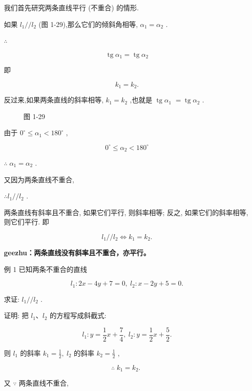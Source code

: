 \documentclass[lang=cn,newtx,10.5pt,scheme=chinese]{elegantbook}
\begin{document}
我们首先研究两条直线平行 (不重合) 的情形.

如果 \({l}_{1}//{l}_{2}\) (图 1-29),那么它们的倾斜角相等, \({\alpha }_{1} = {\alpha }_{2}\) .

\(\therefore\)

\[
  \operatorname{tg}{\alpha }_{1} = \operatorname{tg}{\alpha }_{2}
\]

即

\[
    {k}_{1} = {k}_{2}\text{.}
\]

反过来,如果两条直线的斜率相等, \({k}_{1} = {k}_{2}\) ,也就是 \(\operatorname{tg}{\alpha }_{1}\) \(= \operatorname{tg}{\alpha }_{2}\) .

\begin{figure}[h]
  \centering
  
  \caption{图 1-29}
\end{figure}

由于 \({0}^{ \circ } \leq {\alpha }_{1} < {180}^{ \circ }\) ,

\[
    {0}^{ \circ } \leq {\alpha }_{2} < {180}^{ \circ }
\]

\(\therefore \;{\alpha }_{1} = {\alpha }_{2}\) .

又因为两条直线不重合,

\(\therefore {l}_{1}//{l}_{2}\) .
\begin{corollary}
两条直线有斜率且不重合, 如果它们平行, 则斜率相等; 反之, 如果它们的斜率相等, 则它们平行. 即

\[
    {l}_{1}//{l}_{2} \Leftrightarrow {k}_{1} = {k}_{2}\text{.}
\]

\end{corollary}

\textbf{geezhu：两条直线没有斜率且不重合，亦平行。}

例 1 已知两条不重合的直线

\[
    {l}_{1} : {2x} - {4y} + 7 = 0,\;{l}_{2} : x - {2y} + 5 = 0.
\]

求证: \({l}_{1}//{l}_{2}\) .

证明: 把 \({l}_{1}\text{、}{l}_{2}\) 的方程写成斜截式:

\[
    {l}_{1} : y = \frac{1}{2}x + \frac{7}{4},\;{l}_{2} : y = \frac{1}{2}x + \frac{5}{2}.
\]

则 \({l}_{1}\) 的斜率 \({k}_{1} = \frac{1}{2},\;{l}_{2}\) 的斜率 \({k}_{2} = \frac{1}{2}\) ,

\[
  \therefore \;{k}_{1} = {k}_{2}\text{. }
\]

又 \(\because\) 两条直线不重合,
\end{document}
